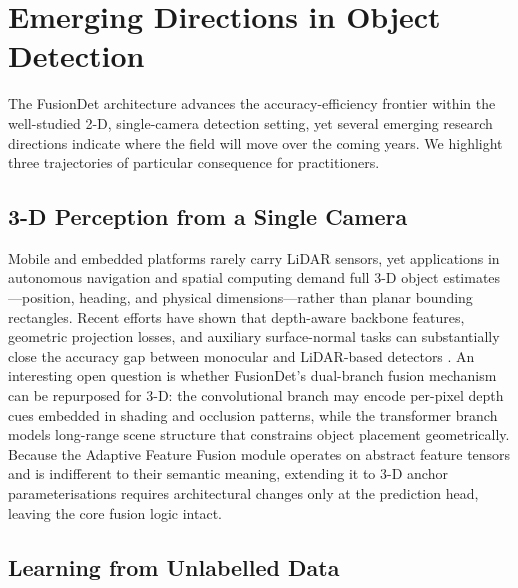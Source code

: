 
\section{Emerging Directions in Object Detection}
\label{sec:future}

The FusionDet architecture advances the accuracy-efficiency frontier within
the well-studied 2-D, single-camera detection setting, yet several emerging
research directions indicate where the field will move over the coming years.
We highlight three trajectories of particular consequence for practitioners.

\subsection{3-D Perception from a Single Camera}

Mobile and embedded platforms rarely carry LiDAR sensors, yet applications
in autonomous navigation and spatial computing demand full 3-D object
estimates—position, heading, and physical dimensions—rather than planar
bounding rectangles. Recent efforts have shown that depth-aware backbone
features, geometric projection losses, and auxiliary surface-normal tasks
can substantially close the accuracy gap between monocular and LiDAR-based
detectors \cite{wang2022monocular}. An interesting open question is whether
FusionDet's dual-branch fusion mechanism can be repurposed for 3-D: the
convolutional branch may encode per-pixel depth cues embedded in shading and
occlusion patterns, while the transformer branch models long-range scene
structure that constrains object placement geometrically. Because the
Adaptive Feature Fusion module operates on abstract feature tensors and is
indifferent to their semantic meaning, extending it to 3-D anchor
parameterisations requires architectural changes only at the prediction head,
leaving the core fusion logic intact.

\subsection{Learning from Unlabelled Data}


